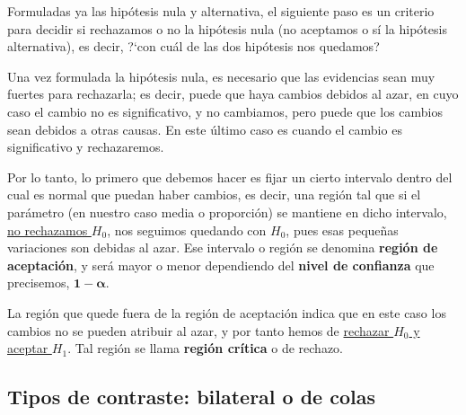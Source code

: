 \begin{definition}

Formuladas ya las hipótesis nula y alternativa, el siguiente paso es un criterio para decidir si rechazamos o no la hipótesis nula (no aceptamos o sí la hipótesis alternativa), es decir, ?`con cuál de las dos hipótesis nos quedamos?

\vspace{2mm} Una vez formulada la hipótesis nula, es necesario que las evidencias sean muy fuertes para rechazarla; es decir, puede que haya cambios debidos al azar, en cuyo caso el cambio no es significativo, y no cambiamos, pero puede que los cambios sean debidos a otras causas. En este último caso es cuando el cambio es significativo y rechazaremos.

\vspace{2mm} Por lo tanto, lo primero que debemos hacer es fijar un cierto intervalo dentro del cual es normal que puedan haber cambios, es decir, una región tal que si el parámetro (en nuestro caso media o proporción) se mantiene en dicho intervalo, \underline{no rechazamos $H_0$}, nos seguimos quedando con $H_0$, pues esas pequeñas variaciones son debidas al azar. Ese intervalo o región se denomina \textbf{región de aceptación}, y será mayor o menor dependiendo del \textbf{nivel de confianza} que precisemos, $\boldsymbol{1-\alpha}$.

\vspace{2mm} La región que quede fuera de la región de aceptación indica que en este caso los cambios no se pueden atribuir al azar, y por tanto hemos de \underline{rechazar $H_0$ y aceptar $H_1$}. Tal región se llama \textbf{región crítica} o de rechazo.
\end{definition}

\subsection{Tipos de contraste: bilateral o de colas}


